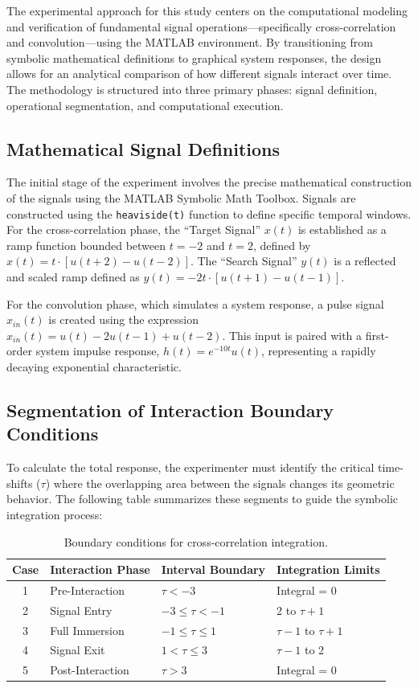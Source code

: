 The experimental approach for this study centers on the computational modeling and verification of fundamental signal operations—specifically cross-correlation and convolution—using the MATLAB environment. By transitioning from symbolic mathematical definitions to graphical system responses, the design allows for an analytical comparison of how different signals interact over time. The methodology is structured into three primary phases: signal definition, operational segmentation, and computational execution.


\subsection{Mathematical Signal Definitions}
The initial stage of the experiment involves the precise mathematical construction of the signals using the MATLAB Symbolic Math Toolbox. Signals are constructed using the \texttt{heaviside(t)} function to define specific temporal windows. For the cross-correlation phase, the ``Target Signal'' $x(t)$ is established as a ramp function bounded between $t = -2$ and $t = 2$, defined by $x(t) = t \cdot [u(t+2) - u(t-2)]$. The ``Search Signal'' $y(t)$ is a reflected and scaled ramp defined as $y(t) = -2t \cdot [u(t+1) - u(t-1)]$. 

For the convolution phase, which simulates a system response, a pulse signal $x_{in}(t)$ is created using the expression $x_{in}(t) = u(t) - 2u(t-1) + u(t-2)$. This input is paired with a first-order system impulse response, $h(t) = e^{-10t}u(t)$, representing a rapidly decaying exponential characteristic.


\subsection{Segmentation of Interaction Boundary Conditions}
To calculate the total response, the experimenter must identify the critical time-shifts ($\tau$) where the overlapping area between the signals changes its geometric behavior. The following table summarizes these segments to guide the symbolic integration process:

\begin{table}[h!]
\centering
\begin{tabular}{|c|l|l|l|}
\hline
\textbf{Case} & \textbf{Interaction Phase} & \textbf{Interval Boundary} & \textbf{Integration Limits} \\ \hline
1 & Pre-Interaction & $\tau < -3$ & Integral = 0 \\ \hline
2 & Signal Entry & $-3 \leq \tau < -1$ & 2 to $\tau + 1$ \\ \hline
3 & Full Immersion & $-1 \leq \tau \leq 1$ & $\tau - 1$ to $\tau + 1$ \\ \hline
4 & Signal Exit & $1 < \tau \leq 3$ & $\tau - 1$ to 2 \\ \hline
5 & Post-Interaction & $\tau > 3$ & Integral = 0 \\ \hline
\end{tabular}
\caption{Boundary conditions for cross-correlation integration.}
\end{table}

